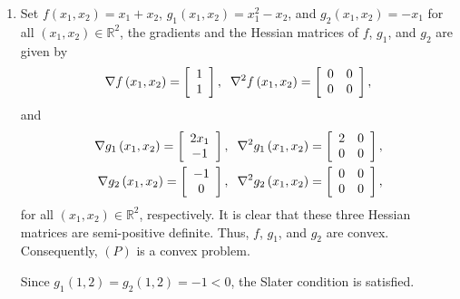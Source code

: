 \documentclass[a4paper]{article}
\numberwithin{equation}{section}
\begin{document}
\begin{enumerate}
\item Set $f\left( {{x_1},{x_2}} \right) = {x_1} + {x_2}$, ${g_1}\left( {{x_1},{x_2}} \right) = x_1^2 - {x_2}$, and ${g_2}\left( {{x_1},{x_2}} \right) =  - {x_1}$ for all $\left(x_1,x_2\right)\in \mathbb{R}^2$, the gradients and the Hessian matrices of $f$, $g_1$, and $g_2$ are given by
\begin{align}
\nabla f\left( {{x_1},{x_2}} \right) = \left[ {\begin{array}{*{20}{c}}
1\\
1
\end{array}} \right],\hspace{0.2cm} {\nabla ^2}f\left( {{x_1},{x_2}} \right) = \left[ {\begin{array}{*{20}{c}}
0&0\\
0&0
\end{array}} \right],
\end{align}
and
\begin{align}
\nabla {g_1}\left( {{x_1},{x_2}} \right) = \left[ {\begin{array}{*{20}{c}}
{2{x_1}}\\
{ - 1}
\end{array}} \right],\hspace{0.2cm} {\nabla ^2}{g_1}\left( {{x_1},{x_2}} \right) = \left[ {\begin{array}{*{20}{c}}
2&0\\
0&0
\end{array}} \right],\\
\nabla {g_2}\left( {{x_1},{x_2}} \right) = \left[ {\begin{array}{*{20}{c}}
{ - 1}\\
0
\end{array}} \right],\hspace{0.2cm} {\nabla ^2}{g_2}\left( {{x_1},{x_2}} \right) = \left[ {\begin{array}{*{20}{c}}
0&0\\
0&0
\end{array}} \right],
\end{align}
for all $\left(x_1,x_2\right)\in \mathbb{R}^2$, respectively. It is clear that these three Hessian matrices are semi-positive definite. Thus, $f$, $g_1$, and $g_2$ are convex. Consequently, $\left(P\right)$ is a convex problem.

Since ${g_1}\left( {1,2} \right) = {g_2}\left( {1,2} \right) =  - 1<0$, the Slater condition is satisfied.


\end{enumerate}
\end{document}

